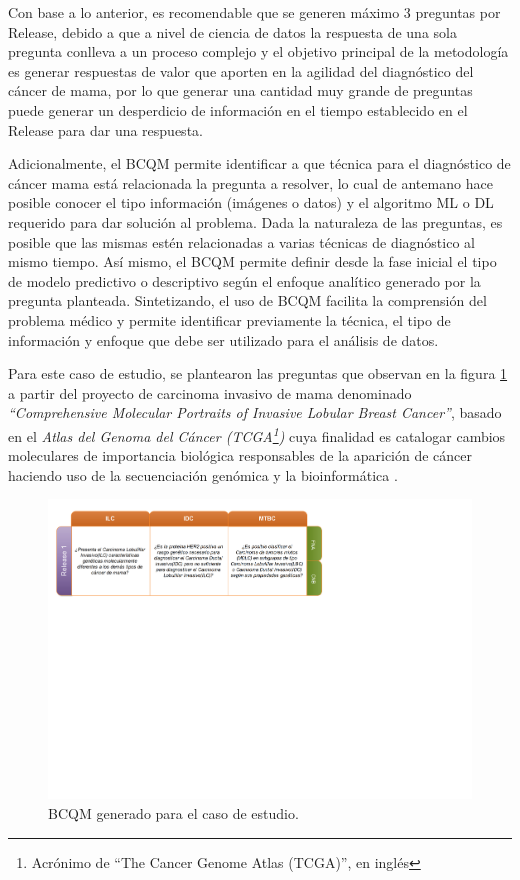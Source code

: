 Con base a lo anterior, es recomendable que se generen máximo 3 preguntas por Release, debido a que a nivel de ciencia de datos la respuesta de una sola pregunta conlleva a un proceso complejo y el objetivo principal de la metodología es generar respuestas de valor que aporten en la agilidad del diagnóstico del cáncer de mama, por lo que generar una cantidad muy grande de preguntas puede generar un desperdicio de información en el tiempo establecido en el Release para dar una respuesta.

Adicionalmente, el BCQM permite identificar a que técnica para el diagnóstico de cáncer mama está relacionada la pregunta a resolver, lo cual de antemano hace posible conocer el tipo información (imágenes o datos) y el algoritmo ML o DL requerido para dar solución al problema. Dada la naturaleza de las preguntas, es posible que las mismas estén relacionadas a varias técnicas de diagnóstico al mismo tiempo. Así mismo, el BCQM permite definir desde la fase inicial el tipo de modelo predictivo o descriptivo según el enfoque analítico generado por la pregunta planteada. Sintetizando, el uso de BCQM facilita la comprensión del problema médico y permite identificar previamente la técnica, el tipo de información y enfoque que debe ser utilizado para el análisis de datos.  

Para este caso de estudio, se plantearon las preguntas que observan en la figura \ref{BCQ_TCGA} a partir del proyecto de carcinoma invasivo de mama denominado \textit{“Comprehensive Molecular Portraits of Invasive Lobular Breast Cancer”}\cite{Ciriello2015}, basado en el \textit {Atlas del Genoma del Cáncer (TCGA\footnote{Acrónimo de “The Cancer Genome Atlas (TCGA)”, en inglés })} cuya finalidad es catalogar cambios moleculares de importancia biológica responsables de la aparición de cáncer haciendo uso de la secuenciación genómica y la bioinformática \cite{TCGA2023}.
\begin{figure}
	\centering
	\includegraphics[width=1
	\linewidth]{IMAGENES/BCQM_TCGA}
	\caption{BCQM generado para el caso de estudio\cite{DSMBCD-BCQM2023}.}
	\label{BCQ_TCGA}
\end{figure}

